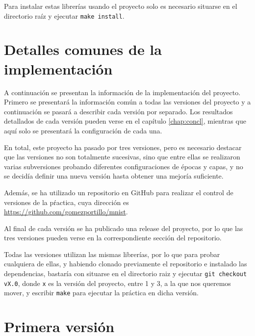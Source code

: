  \bigskip

Para instalar estas librerías usando el proyecto solo es necesario situarse en el directorio raíz y ejecutar \lstinline{make install}.

\section{Detalles comunes de la implementación}

A continuación se presentan la información de la implementación del proyecto. Primero se presentará la información común a todas las versiones del proyecto y a continuación se pasará a describir cada versión por separado. Los resultados detallados de cada versión pueden verse en el capítulo \ref{chap:concl}, mientras que aquí solo se presentará la configuración de cada una.

\bigskip

En total, este proyecto ha pasado por tres versiones, pero es necesario destacar que las versiones no son totalmente sucesivas, sino que entre ellas se realizaron varias subversiones probando diferentes configuraciones de épocas y capas, y no se decidía definir una nueva versión hasta obtener una mejoría suficiente.

\bigskip

Además, se ha utilizado un repositorio en GitHub para realizar el control de versiones de la pŕactica, cuya dirección es \url{https://github.com/gomezportillo/mnist}.

\bigskip

Al final de cada versión se ha publicado una release del proyecto, por lo que las tres versiones pueden verse en la correspondiente sección del repositorio.

\bigskip

Todas las versiones utilizan las mismas librerías, por lo que para probar cualquiera de ellas, y habiendo clonado previamente el repositorio e instalado las dependencias, bastaría con situarse en el directorio raiz y ejecutar \lstinline{git checkout vX.0}, donde  \lstinline{x} es la versión del proyecto, entre 1 y 3, a la que nos queremos mover, y escribir \lstinline{make} para ejecutar la práctica en dicha versión.

\section{Primera versión}
